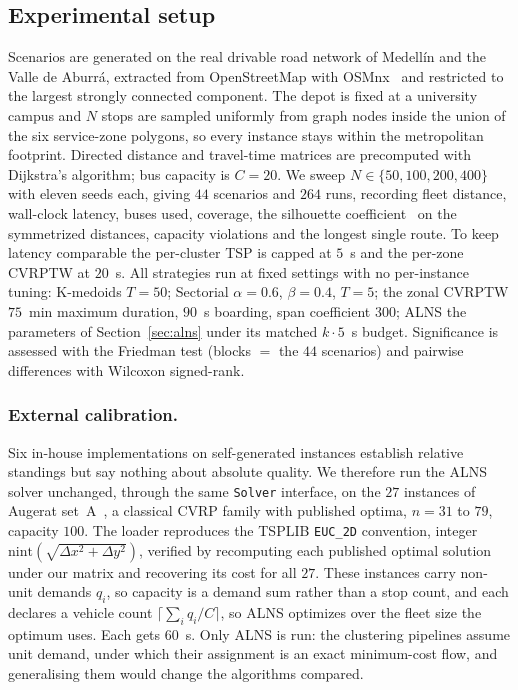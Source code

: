 \documentclass[graybox]{SNmult}
\begin{document}
\subsection{Experimental setup}\label{sec:setup}
Scenarios are generated on the real drivable road network of Medell\'in
and the Valle de Aburr\'a, extracted from OpenStreetMap with
OSMnx~\cite{Boeing2017OSMnx} and restricted to the largest strongly
connected component. The depot is fixed at a university campus and $N$
stops are sampled uniformly from graph nodes inside the union of the six
service-zone polygons, so every instance stays within the metropolitan
footprint. Directed distance and travel-time matrices are precomputed with
Dijkstra's algorithm; bus capacity is $C=20$. We sweep $N\in\{50,100,200,400\}$ with eleven seeds each, giving $44$
scenarios and $264$ runs, recording fleet distance, wall-clock latency,
buses used, coverage, the silhouette
coefficient~\cite{Rousseeuw1987Silhouettes} on the symmetrized distances,
capacity violations and the longest single route. To keep latency
comparable the per-cluster TSP is capped at $5$~s and the per-zone CVRPTW
at $20$~s. All strategies run at fixed settings with no per-instance
tuning: K-medoids $T=50$; Sectorial $\alpha=0.6$, $\beta=0.4$, $T=5$; the
zonal CVRPTW $75$~min maximum duration, $90$~s boarding, span coefficient
$300$; ALNS the parameters of Section~\ref{sec:alns} under its matched
$k\cdot5$~s budget. Significance is assessed with the Friedman test
(blocks $=$ the $44$ scenarios) and pairwise differences with Wilcoxon
signed-rank.

\subsubsection{External calibration.}\label{sec:external}
Six in-house implementations on self-generated instances establish
relative standings but say nothing about absolute quality. We therefore
run the ALNS solver unchanged, through the same \texttt{Solver} interface,
on the $27$ instances of Augerat set~A~\cite{Augerat1995CVRP}, a classical
CVRP family with published optima, $n=31$ to $79$, capacity $100$. The loader reproduces the
TSPLIB \texttt{EUC\_2D} convention, integer
$\mathrm{nint}(\sqrt{\Delta x^2+\Delta y^2})$, verified by recomputing
each published optimal solution under our matrix and recovering its cost
for all $27$. These instances carry non-unit demands $q_i$, so capacity is
a demand sum rather than a stop count, and each declares a vehicle count
$\lceil \sum_i q_i / C\rceil$, so ALNS optimizes over the fleet size the
optimum uses. Each gets $60$~s. Only ALNS is run: the clustering pipelines
assume unit demand, under which their assignment is an exact minimum-cost
flow, and generalising them would change the algorithms compared.
\end{document}
